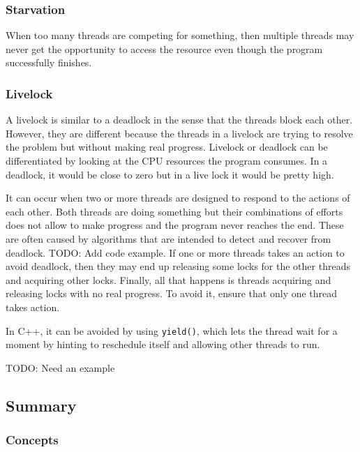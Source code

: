 \documentclass{scrartcl}
\begin{document}
\subsubsection{Starvation}
When too many threads are competing for something, then multiple threads may never get the opportunity to access the resource even though the program successfully finishes. 

\subsubsection{Livelock}
A livelock is similar to a deadlock in the sense that the threads block each other. However, they are different because the threads in a livelock are trying to resolve the problem but without making real progress. Livelock or deadlock can be differentiated by looking at the CPU resources the program consumes. In a deadlock, it would be close to zero but in a live lock it would be pretty high. 

It can occur when two or more threads are designed to respond to the actions of each other. Both threads are doing something but their combinations of efforts does not allow to make progress and the program never reaches the end. These are often caused by algorithms that are intended to detect and recover from deadlock. TODO: Add code example. If one or more threads takes an action to avoid deadlock, then they may end up releasing some locks for the other threads and acquiring other locks. Finally, all that happens is threads acquiring and releasing locks with no real progress. To avoid it, ensure that only one thread takes action.

In C++, it can be avoided by using \texttt{yield()}, which lets the thread wait for a moment by hinting to reschedule itself and allowing other threads to run.

TODO: Need an example

\subsection{Summary}

\subsubsection{Concepts}
\end{document}
